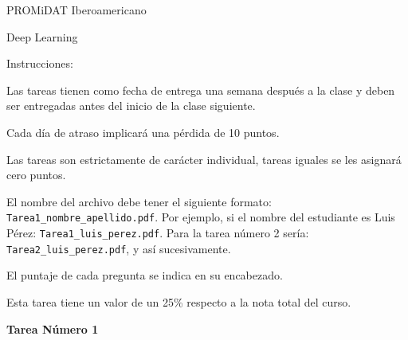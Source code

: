\documentclass[spanish,12pt]{report}
\begin{document}
\textsf{PROMiDAT Iberoamericano}

\textsf{Deep Learning}

\textsf{Instrucciones:}

\begin{itemize}
{\color{Blue}
\item  Las tareas tienen como fecha de entrega una semana después a la clase y deben ser entregadas antes del inicio de la clase siguiente.
\item  Cada día de atraso implicará una pérdida de 10 puntos.
\item  Las tareas son estrictamente de carácter individual, tareas iguales se les asignará cero puntos.
\item  El nombre del archivo debe tener el siguiente formato: {\tt Tarea1\_nombre\_apellido.pdf}. Por ejemplo, si el nombre del estudiante es Luis Pérez: {\tt Tarea1\_luis\_perez.pdf}. Para la tarea número 2 sería: {\tt Tarea2\_luis\_perez.pdf}, y así sucesivamente.
\item  El puntaje de cada pregunta se indica en su encabezado.
\item Esta tarea tiene un valor de un 25\% respecto a la nota total del curso.
}
\end{itemize}

\begin{center}
{\color{Green} \textbf{\LARGE\sc Tarea Número 1}}
\end{center}
\end{document}
